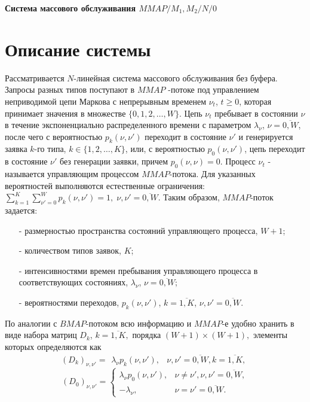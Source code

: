 \documentclass[12pt, a4paper]{article}
\begin{document}
	
	\begin{center}
		{\bf Система массового обслуживания $MMAP/M_1,M_2/N/0$}
	\end{center}
	
	
	\section{ Описание системы}
	
	Рассматривается $N$-линейная система массового обслуживания без буфера.
	Запросы разных типов поступают в $MMAP$ -потоке под управлением
	неприводимой цепи Маркова с непрерывным временем
	$\nu_{t}$, $t\ge0$, которая принимает значения в множестве
	$\{0,1,2,\ldots, W\}$. Цепь
	$\nu_{t}$ пребывает в состоянии $\nu$ в течение экспоненциально
	распределенного времени с параметром $\lambda_{\nu}$,
	$\nu= \overline{0, W}$, после чего с вероятностью $p_{k}(\nu,\nu')$
	переходит в состояние $\nu'$ и генерируется заявка $k$-го типа,
	$k\in\{1,2,\ldots,K\}$, или, с вероятностью $p_{0}(\nu,\nu')$, цепь
	переходит в состояние $\nu'$ без генерации заявки, причем
	$p_{0}(\nu,\nu)=0$. Процесс $\nu_{t}$ - называется
	управляющим процессом $MMAP$-потока.
	Для указанных  вероятностей выполняются естественные ограничения:
	$
	\sum\limits_{k=1}^{K}\sum\limits_{\nu'=0}^{ W}p_{k}(\nu,\nu')=1,
	\;  \nu,\nu'=\overline{0,W}.
	$
	Таким образом, $MMAP$-поток задается:
	\begin{itemize}
		\item[-] размерностью пространства состояний управляющего
		процесса, $ W+1$;
		\item[-] количеством типов заявок, $K$;
		\item[-] интенсивностями времен пребывания управляющего процесса
		в соответствующих состояниях, $\lambda_{\nu}$,
		$\nu= \overline{0, W}$;
		\item[-] вероятностями переходов, $p_{k}(\nu,\nu')$,
		$k= \overline{1,K}$, $\nu,\nu'= \overline{0, W}$.
	\end{itemize}
	
	По аналогии с $BMAP$-потоком всю информацию и $MMAP$-е удобно
	хранить в виде набора матриц $D_{k}$, $k= \overline{1,K},$ порядка
	$ (W+1)\times (W+1),$ элементы которых определяются как
	$$
	(D_{k})_{\nu,\nu'}=\begin{array}{ll}\lambda_{\nu}p_{k}(\nu,\nu'),&\nu,\nu'= \overline{0, W},k= 
	\overline{1,K},\end{array}
	$$
	$$
	(D_{0})_{\nu,\nu'}=\left\{\begin{array}{ll}
	\lambda_{\nu}p_{0}(\nu,\nu'),&\nu\ne\nu',\nu,\nu'= \overline{0,  W},\\
	-\lambda_{\nu},&\nu=\nu'= \overline{0,  W}.
	\end{array}\right.
	$$
	
\end{document}
